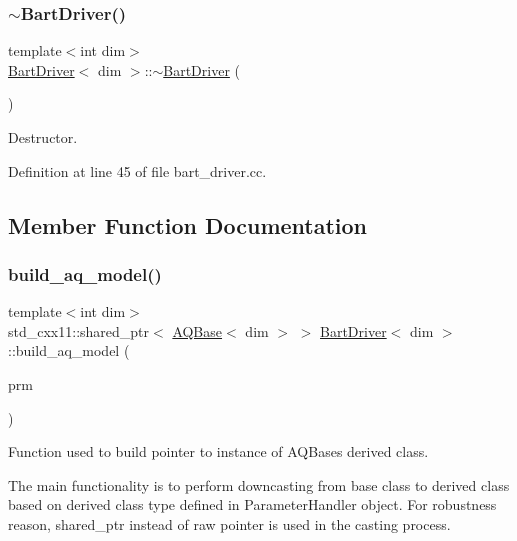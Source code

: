 \subsubsection{\texorpdfstring{$\sim$\+Bart\+Driver()}{~BartDriver()}}
{\footnotesize\ttfamily template$<$int dim$>$ \\
\hyperlink{class_bart_driver}{Bart\+Driver}$<$ dim $>$\+::$\sim$\hyperlink{class_bart_driver}{Bart\+Driver} (\begin{DoxyParamCaption}{ }\end{DoxyParamCaption})}



Destructor. 



Definition at line 45 of file bart\+\_\+driver.\+cc.



\subsection{Member Function Documentation}
\mbox{\label{class_bart_driver_ac5d2985a0286bdac161f3c0fbb80197a}} 
\subsubsection{\texorpdfstring{build\+\_\+aq\+\_\+model()}{build\_aq\_model()}}
{\footnotesize\ttfamily template$<$int dim$>$ \\
std\+\_\+cxx11\+::shared\+\_\+ptr$<$ \hyperlink{class_a_q_base}{A\+Q\+Base}$<$ dim $>$ $>$ \hyperlink{class_bart_driver}{Bart\+Driver}$<$ dim $>$\+::build\+\_\+aq\+\_\+model (\begin{DoxyParamCaption}\item[{Parameter\+Handler \&}]{prm }\end{DoxyParamCaption})\hspace{0.3cm}{\ttfamily [private]}}



Function used to build pointer to instance of A\+Q\+Base\textquotesingle{}s derived class. 

The main functionality is to perform downcasting from base class to derived class based on derived class type defined in Parameter\+Handler object. For robustness reason, shared\+\_\+ptr instead of raw pointer is used in the casting process.


